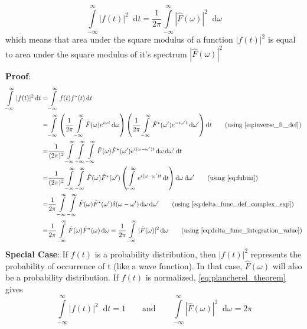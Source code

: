 \documentclass[11pt, a4paper]{article}
\newcommand{\eqrefnp}[1]{\textup{\ref{#1}}}
\newcommand{\primed}[1]{#1^{\prime}}
\newcommand{\omegap}{\primed{\omega}}	%
\newcommand{\diff}{\mathop{}\!\mathrm{d}}
\newcommand{\dt}{\diff t}
\newcommand{\domega}{\diff \omega}
\newcommand{\domegap}{\diff \omegap}
\newcommand{\dint}[2]{\int \limits_{#1}^{#2}}  %
\newcommand{\intinfty}{\dint{-\infty}{\infty}}	%
\newcommand{\iintinfty}{\intinfty \intinfty}	%
\newcommand{\iiintinfty}{\intinfty \intinfty \intinfty}	%
\begin{document}
\begin{equation}\label{eq:plancherel_theorem}
	\intinfty |f(t)|^{2} \dt = \frac{1}{2 \pi} \intinfty |\hat{F}(\omega)|^{2} \domega
\end{equation}
which means that area under the square modulus of a function $|f(t)|^{2}$ is equal to area under the square modulus of it's spectrum $|\hat{F}(\omega)|^{2}$

\vspace{4pt}
\noindent
\textbf{Proof}: 
\begin{align*}
	\intinfty |f(t)|^{2} \dt 
	= & \intinfty f(t)f^{\star}(t) \dt \\
	= & \intinfty \left(\frac{1}{2 \pi} \intinfty \hat{F}(\omega) e^{i \omega t} \domega \right) \left(\frac{1}{2 \pi} \intinfty \hat{F}^{\star}(\omegap) e^{-i \omegap t} \domegap \right) \dt \tag{using \eqrefnp{eq:inverse_ft_def}} \\
	= & \frac{1}{(2 \pi)^2} \iiintinfty \hat{F}(\omega) \hat{F}^{\star}(\omegap) e^{i (\omega - \omegap) t} \domega \domegap \dt \\
	= & \frac{1}{(2 \pi)^2} \iintinfty \hat{F}(\omega) \hat{F}^{\star}(\omegap) \left( \intinfty e^{i (\omega - \omegap) t} \dt \right) \domega \domegap \tag{using \eqrefnp{eq:fubini}} \\
	= & \frac{1}{2 \pi} \iintinfty \hat{F}(\omega) \hat{F}^{\star}(\omegap) \delta(\omega - \omegap) \domega \domegap \tag{using \eqrefnp{eq:delta_func_def_complex_exp}} \\
	= & \frac{1}{2 \pi} \intinfty \hat{F}(\omega) \hat{F}^{\star}(\omega) \domega 
	= \frac{1}{2 \pi} \intinfty |\hat{F}(\omega)|^{2} \domega  \tag{using \eqrefnp{eq:delta_func_integration_value}} \\
\end{align*}
\noindent
\textbf{Special Case}: If $f(t)$ is a probability distribution, then $|f(t)|^{2}$ represents the probability of 
occurrence of t (like a wave function). In that case, $\hat{F}(\omega)$ will also be a probability distribution. If $f(t)$ is normalized, \eqref{eq:plancherel_theorem} gives
\begin{equation}\label{eq:plancherel_normal_func_and_spectrum}
	\intinfty |f(t)|^{2} \dt = 1 \qquad \text{and} \qquad \intinfty |\hat{F}(\omega)|^{2} \domega = 2 \pi
\end{equation}
\end{document}
